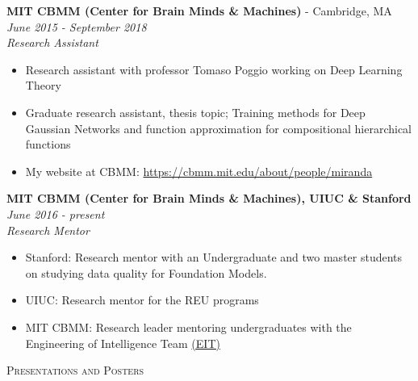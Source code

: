 \documentclass{article}
\newenvironment{changemargin}[2]{%
  \begin{list}{}{%
    \setlength{\topsep}{0pt}%
    \setlength{\leftmargin}{#1}%
    \setlength{\rightmargin}{#2}%
    \setlength{\listparindent}{\parindent}%
    \setlength{\itemindent}{\parindent}%
    \setlength{\parsep}{\parskip}%
  }%
  \item[]}{\end{list}
}
\newcommand{\lineover}{
	\begin{changemargin}{-0.05in}{-0.05in}
		\vspace*{-8pt}
		\hrulefill \\
		\vspace*{-2pt}
	\end{changemargin}
}
\newcommand{\header}[1]{
	\begin{changemargin}{-0.5in}{-0.5in}
		\scshape{#1}\\
  	\lineover
	\end{changemargin}
}
\newenvironment{body} {
	\vspace*{-16pt}
	\begin{changemargin}{-0.25in}{-0.5in}
  }	
	{\end{changemargin}
}
\begin{document}
\begin{body}
	\textbf{MIT CBMM (Center for Brain Minds \& Machines)} - Cambridge, MA \hfill \emph{June 2015 - September 2018}\\
	\emph{Research Assistant}\\
	\vspace*{-3pt}
	\begin{itemize} \itemsep -2pt  %
        \item Research assistant with professor Tomaso Poggio working on Deep Learning Theory
        \item Graduate research assistant, thesis topic; Training methods for Deep Gaussian Networks and function approximation for compositional hierarchical functions
        \item My website at CBMM: \href{https://cbmm.mit.edu/about/people/miranda}{https://cbmm.mit.edu/about/people/miranda}
	\end{itemize}
	\vspace{5 pt}
    
	\textbf{MIT CBMM (Center for Brain Minds \& Machines), UIUC \& Stanford} \hfill \emph{June 2016 - present}\\
	\emph{Research Mentor}\\
	\vspace*{-3pt}
	\begin{itemize} \itemsep -2pt  %
        \item Stanford: Research mentor with an Undergraduate and two master students on studying data quality for Foundation Models.
        \item UIUC: Research mentor for the REU programs
        \item MIT CBMM: Research leader mentoring undergraduates with the Engineering of Intelligence Team \href{https://cbmm.mit.edu/eit/people}{(EIT)}
	\end{itemize}
	\vspace{5 pt}
    
\end{body}


\header{Presentations and Posters}
\end{document}
